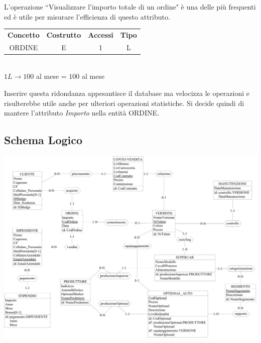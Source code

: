 \documentclass[11pt]{article}
\begin{document}
L'operazione ``Visualizzare l'importo totale di un ordine" è una delle più
frequenti ed è utile per misurare l'efficienza di questo attributo.

\begin{table}[H]
    \centering
    \begin{tabular}{c c c c}
        \rowcolor{red!20!}
        \textbf{Concetto} & \textbf{Costrutto} & \textbf{Accessi} &
        \textbf{Tipo}\\
        ORDINE & E & 1 & L \\
    \end{tabular}\\
    \( 1L \rightarrow 100 \) al mese = \( 100 \) al mese
\end{table}

Inserire questa ridondanza appesantisce il database ma velocizza le operazioni e
risulterebbe utile anche per ulteriori operazioni statistiche. 
Si decide quindi di mantere l'attributo \textit{Importo} nella entità ORDINE.

\newpage

\subsection{Schema Logico}

\begin{center}
    \includegraphics[height=\linewidth, angle=90]{images/fullSchemes/logico.jpeg}
\end{center}
\end{document}
